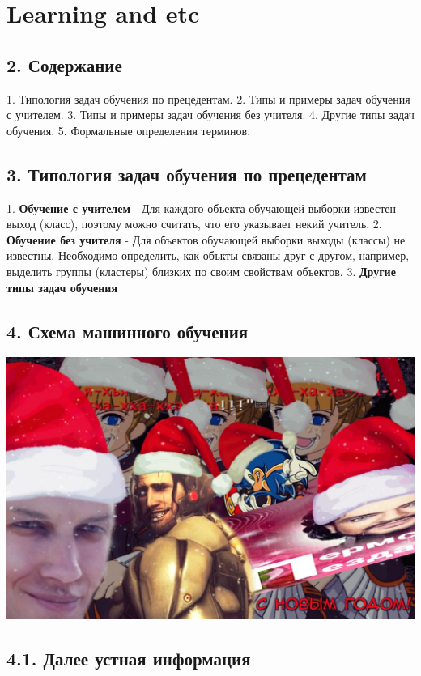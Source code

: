 \section{Learning and etc}

\subsection{2. Содержание}

1. Типология задач обучения по прецедентам.
2. Типы и примеры задач обучения с учителем.
3. Типы и примеры задач обучения без учителя.
4. Другие типы задач обучения.
5. Формальные определения терминов.

\subsection{3. Типология задач обучения по прецедентам}

1. \textbf{Обучение с учителем}
    - Для каждого объекта обучающей выборки известен выход (класс), поэтому
    можно считать, что его указывает некий учитель.
2. \textbf{Обучение без учителя}
    - Для объектов обучающей выборки выходы (классы) не известны.
    Необходимо определить, как объкты связаны друг с другом, например,
    выделить группы (кластеры) близких по своим свойствам объектов.
3. \textbf{Другие типы задач обучения}

\subsection{4. Схема машинного обучения}

\includegraphics[scale=0.3]{figures/samplefigure.jpg}

\subsection{4.1. Далее устная информация}

